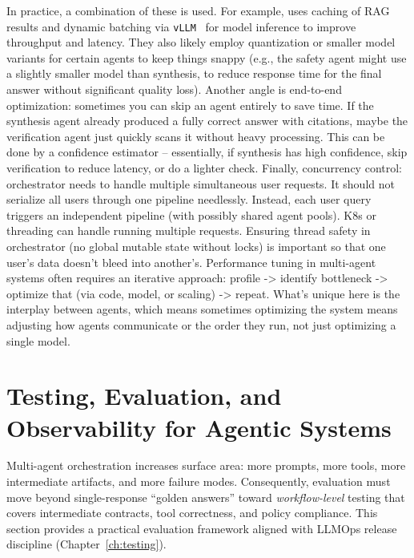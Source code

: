 In practice, a combination of these is used. For example, \ishtar{} uses caching of RAG results and dynamic batching via \texttt{vLLM}~\cite{Kwon2023vLLM} for model inference to improve throughput and latency. They also likely employ quantization or smaller model variants for certain agents to keep things snappy (e.g., the safety agent might use a slightly smaller model than synthesis, to reduce response time for the final answer without significant quality loss). Another angle is end-to-end optimization: sometimes you can skip an agent entirely to save time. If the synthesis agent already produced a fully correct answer with citations, maybe the verification agent just quickly scans it without heavy processing. This can be done by a confidence estimator – essentially, if synthesis has high confidence, skip verification to reduce latency, or do a lighter check. Finally, concurrency control: orchestrator needs to handle multiple simultaneous user requests. It should not serialize all users through one pipeline needlessly. Instead, each user query triggers an independent pipeline (with possibly shared agent pools). K8s or threading can handle running multiple requests. Ensuring thread safety in orchestrator (no global mutable state without locks) is important so that one user’s data doesn’t bleed into another’s. Performance tuning in multi-agent systems often requires an iterative approach: profile -> identify bottleneck -> optimize that (via code, model, or scaling) -> repeat. What’s unique here is the interplay between agents, which means sometimes optimizing the system means adjusting how agents communicate or the order they run, not just optimizing a single model.



\section{Testing, Evaluation, and Observability for Agentic Systems}
\label{sec:agent-eval}
Multi-agent orchestration increases surface area: more prompts, more tools, more intermediate artifacts, and more failure modes.
Consequently, evaluation must move beyond single-response ``golden answers'' toward \emph{workflow-level} testing that covers intermediate contracts, tool correctness, and policy compliance.
This section provides a practical evaluation framework aligned with LLMOps release discipline (Chapter~\ref{ch:testing}).


